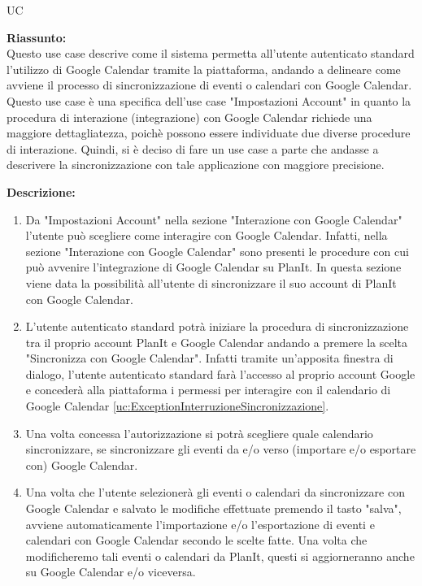 \begin{listaPersonale}{UC}
\begin{listaPersonale2}[UC] {}
\begin{listaPersonale3} [UC]{}
            \textbf{Riassunto:} \\
            Questo use case descrive come il sistema permetta all'utente autenticato standard l'utilizzo di Google Calendar tramite la piattaforma, andando a delineare come avviene il processo di sincronizzazione di eventi o calendari con Google Calendar.
            Questo use case è una specifica dell'use case "Impostazioni Account" in quanto la procedura di interazione (integrazione) con Google Calendar richiede una maggiore dettagliatezza, poichè possono essere individuate due diverse procedure di interazione. Quindi, si è deciso di fare un use case a parte che andasse a descrivere la sincronizzazione con tale applicazione con maggiore precisione.

            \textbf{Descrizione:} \\
            \begin{enumerate}
                \item Da "Impostazioni Account" nella sezione "Interazione con Google Calendar" l'utente può scegliere come interagire con Google Calendar. Infatti, nella sezione "Interazione con Google Calendar" sono presenti le procedure con cui può avvenire l'integrazione di Google Calendar su PlanIt. In questa sezione viene data la possibilità all'utente di sincronizzare il suo account di PlanIt con Google Calendar.
                \item L'utente autenticato standard potrà iniziare la procedura di sincronizzazione tra il proprio account PlanIt e Google Calendar andando a premere la scelta "Sincronizza con Google Calendar". Infatti tramite un'apposita finestra di dialogo, l'utente autenticato standard farà l'accesso al proprio account Google e concederà alla piattaforma i permessi per interagire con il calendario di Google Calendar \ref{uc:ExceptionInterruzioneSincronizzazione}.
                \item Una volta concessa l'autorizzazione si potrà scegliere quale calendario sincronizzare, se sincronizzare gli eventi da e/o verso (importare e/o esportare con) Google Calendar.
                \item Una volta che l'utente selezionerà gli eventi o calendari da sincronizzare con Google Calendar e salvato le modifiche effettuate premendo il tasto "salva", avviene automaticamente l'importazione e/o l'esportazione di eventi e calendari con Google Calendar secondo le scelte fatte. Una volta che modificheremo tali eventi o calendari da PlanIt, questi si aggiorneranno anche su Google Calendar e/o viceversa.
            \end{enumerate}


\end{listaPersonale3}
\end{listaPersonale2}
\end{listaPersonale}
